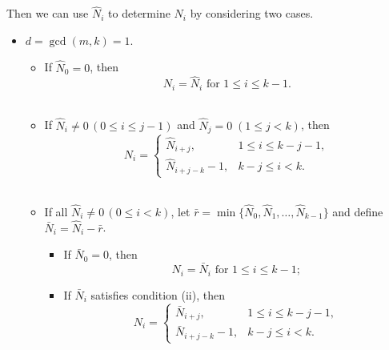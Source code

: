 \documentclass[preprint,3p,10pt]{elsarticle}
\theoremstyle{definition}
\begin{document}
Then we can use \(\hat{N}_i\) to determine \(N_i\) by considering two cases. 
\begin{itemize}
    \item[Case $1$:]\(d=\gcd(m,k)=1\). \\
\begin{itemize}
     \item[(i)] \quad If \(\hat{N}_0 = 0\), then\\
     \[
     N_i = \hat{N}_i \text{ for } 1 \leq i \leq k-1.
     \] \\
     \item[(ii)] \quad If \(\hat{N}_i \neq 0 \, (0 \leq i \leq j - 1)\) and \(\hat{N}_j = 0 \; (1 \leq j < k)\), then
\[
N_i = 
\begin{cases}
\hat{N}_{i+j}, & 1 \leq i \leq k - j - 1, \\
\hat{N}_{i+j-k} - 1, & k - j \leq i < k.
\end{cases}
\]\\
     \item[(iii)] \quad If all \(\hat{N}_i \neq 0 \,(0 \leq i < k)\), let \(\bar{r} = \min\{\hat{N}_0,\hat{N}_1,\ldots,\hat{N}_{k-1}\}\) and define \(\bar{N}_i = \hat{N}_i - \bar{r}\).\\
    \begin{itemize}
         \item[(a)] If \(\bar{N}_0=0\), then\\
         \[
         N_i = \bar{N}_i \text{ for } 1 \leq i \leq k-1;
         \]
         \item[(b)] If \(\bar{N}_i\) satisfies condition (ii), then
     \[
N_i = 
\begin{cases}
\bar{N}_{i+j}, & 1 \leq i \leq k - j - 1, \\
\bar{N}_{i+j-k} - 1, & k - j \leq i < k.
\end{cases}
\]
\end{itemize}
\end{itemize}


\end{itemize}
\end{document}
